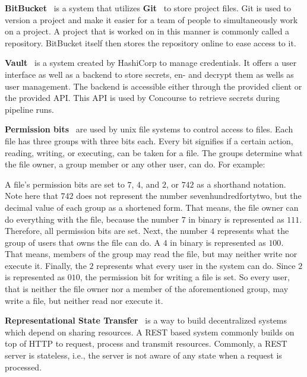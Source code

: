 \textbf{BitBucket}~\cite{bitbucket} is a system that utilizes \textbf{Git}~\cite{git} to store project files.
Git is used to version a project and make it easier for a team of people to simultaneously work on a project.
A project that is worked on in this manner is commonly called a repository.
BitBucket itself then stores the repository online to ease access to it.

\textbf{Vault}~\cite{vault} is a system created by HashiCorp to manage credentials.
It offers a user interface as well as a backend to store secrets, en- and decrypt them as wells as user management.
The backend is accessible either through the provided client or the provided API.
This API is used by Concourse to retrieve secrets during pipeline runs.

\textbf{Permission bits}~\cite{unix-file-permissions} are used by unix file systems to control access to files.
Each file has three groups with three bits each.
Every bit signifies if a certain action, reading, writing, or executing, can be taken for a file.
The groups determine what the file owner, a group member or any other user, can do.
For example:

A file's permission bits are set to $7$, $4$, and $2$, or $742$ as a shorthand notation.
Note here that $742$ does not represent the number sevenhundredfortytwo, but the decimal value of each group as a shortened form.
That means, the file owner can do everything with the file, because the number $7$ in binary is represented as $111$.
Therefore, all permission bits are set.
Next, the number $4$ represents what the group of users that owns the file can do.
A $4$ in binary is represented as $100$.
That means, members of the group may read the file, but may neither write nor execute it.
Finally, the $2$ represents what every user in the system can do.
Since $2$ is represented as $010$, the permission bit for writing a file is set.
So every user, that is neither the file owner nor a member of the aforementioned group, may write a file, but neither read nor execute it.

\textbf{Representational State Transfer}~\cite{extending-representation-state-transfer} is a way to build decentralized systems which depend on sharing resources.
A REST based system commonly builds on top of HTTP to request, process and transmit resources.
Commonly, a REST server is stateless, i.e., the server is not aware of any state when a request is processed.

